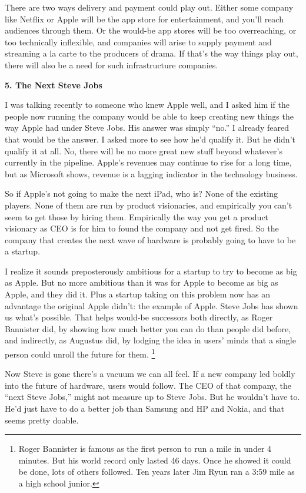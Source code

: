 \documentclass[12pt]{book}
\begin{document}
There are two ways delivery and payment could play out. Either some
company like Netflix or Apple will be the app store for entertainment,
and you'll reach audiences through them. Or the would-be app stores will
be too overreaching, or too technically inflexible, and companies will
arise to supply payment and streaming a la carte to the producers of
drama. If that's the way things play out, there will also be a need for
such infrastructure companies.

\textbf{5. The Next Steve Jobs}

I was talking recently to someone who knew Apple well, and I asked him
if the people now running the company would be able to keep creating new
things the way Apple had under Steve Jobs. His answer was simply ``no.''
I already feared that would be the answer. I asked more to see how he'd
qualify it. But he didn't qualify it at all. No, there will be no more
great new stuff beyond whatever's currently in the pipeline. Apple's
revenues may continue to rise for a long time, but as Microsoft shows,
revenue is a lagging indicator in the technology business.

So if Apple's not going to make the next iPad, who is? None of the
existing players. None of them are run by product visionaries, and
empirically you can't seem to get those by hiring them. Empirically the
way you get a product visionary as CEO is for him to found the company
and not get fired. So the company that creates the next wave of hardware
is probably going to have to be a startup.

I realize it sounds preposterously ambitious for a startup to try to
become as big as Apple. But no more ambitious than it was for Apple to
become as big as Apple, and they did it. Plus a startup taking on this
problem now has an advantage the original Apple didn't: the example of
Apple. Steve Jobs has shown us what's possible. That helps would-be
successors both directly, as Roger Bannister did, by showing how much
better you can do than people did before, and indirectly, as Augustus
did, by lodging the idea in users' minds that a single person could
unroll the future for them. \footnote{Roger Bannister is famous as the first person to run a mile in
under 4 minutes. But his world record only lasted 46 days. Once he
showed it could be done, lots of others followed. Ten years later Jim
Ryun ran a 3:59 mile as a high school junior.}

Now Steve is gone there's a vacuum we can all feel. If a new company led
boldly into the future of hardware, users would follow. The CEO of that
company, the ``next Steve Jobs,'' might not measure up to Steve Jobs.
But he wouldn't have to. He'd just have to do a better job than Samsung
and HP and Nokia, and that seems pretty doable.
\end{document}
